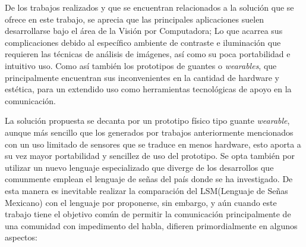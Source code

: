 \hfill \break
\justifying
De los trabajos realizados y que se encuentran relacionados a la solución que se ofrece en este trabajo, se aprecia que las principales aplicaciones suelen desarrollarse bajo el área de la Visión por Computadora; Lo que acarrea sus complicaciones debido al específico ambiente de contraste e iluminación que requieren las técnicas de análisis de imágenes, así como su poca portabilidad e intuitivo uso. Como así también los prototipos de guantes o \textit{wearables}, que principalmente encuentran sus inconvenientes en la cantidad de hardware y estética, para un extendido uso como herramientas tecnológicas de apoyo en la comunicación.

\hfill \break
\justifying
La solución propuesta se decanta por un prototipo físico tipo guante \textit{wearable}, aunque más sencillo que los generados por trabajos anteriormente mencionados con un uso limitado de sensores que se traduce en menos hardware, esto aporta a su vez mayor portabilidad y sencillez de uso del prototipo. Se opta también por utilizar un nuevo lenguaje especializado que diverge de los desarrollos que comunmente emplean el lenguaje de señas del país donde se ha investigado.
De esta manera es inevitable realizar la comparación del LSM(Lenguaje de Señas Mexicano) con el lenguaje por proponerse, sin embargo, y aún cuando este trabajo tiene el objetivo común de permitir la comunicación principalmente de una comunidad con impedimento del habla, difieren primordialmente en algunos aspectos: 


